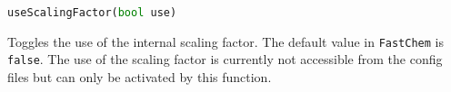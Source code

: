\documentclass[numbers=noenddot]{fcmanual}
\newcommand{\fc}{\texttt{FastChem}\xspace}
\begin{document}
\bigbreak

\lstinline[language=Python]!useScalingFactor(bool use)!
\begin{addmargin}[25pt]{0pt}
	Toggles the use of the internal scaling factor. The default value in \fc is \lstinline[language=Python]!false!. The use of the scaling factor is currently not accessible from the config files but can only be activated by this function.
\end{addmargin}





  
\end{document}
